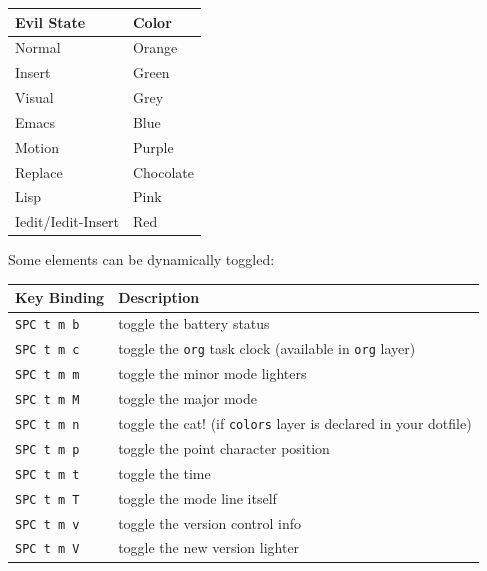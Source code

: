 \documentclass[11pt]{article}
\begin{document}
\begin{center}
\begin{tabular}{ll}
Evil State & Color\\
\hline
Normal & Orange\\
Insert & Green\\
Visual & Grey\\
Emacs & Blue\\
Motion & Purple\\
Replace & Chocolate\\
Lisp & Pink\\
Iedit/Iedit-Insert & Red\\
\end{tabular}
\end{center}

Some elements can be dynamically toggled:

\begin{center}
\begin{tabular}{ll}
Key Binding & Description\\
\hline
\texttt{SPC t m b} & toggle the battery status\\
\texttt{SPC t m c} & toggle the \texttt{org} task clock (available in \texttt{org} layer)\\
\texttt{SPC t m m} & toggle the minor mode lighters\\
\texttt{SPC t m M} & toggle the major mode\\
\texttt{SPC t m n} & toggle the cat! (if \texttt{colors} layer is declared in your dotfile)\\
\texttt{SPC t m p} & toggle the point character position\\
\texttt{SPC t m t} & toggle the time\\
\texttt{SPC t m T} & toggle the mode line itself\\
\texttt{SPC t m v} & toggle the version control info\\
\texttt{SPC t m V} & toggle the new version lighter\\
\end{tabular}
\end{center}
\end{document}
